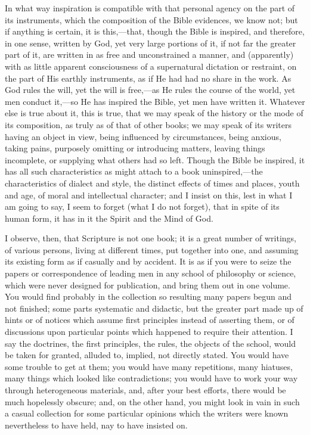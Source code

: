 In what way inspiration is compatible with that personal agency on the part of its instruments, which the composition of the
Bible evidences, we know not; but if anything is certain, it is this,—that,
though the Bible is inspired, and therefore, in one sense, written by
God, yet very large portions of it, if not far the greater part of it,
are written in as free and unconstrained a manner, and (apparently)
with as little apparent consciousness of a supernatural dictation or
restraint, on the part of His earthly instruments, as if He had had no
share in the work. As God rules the will, yet the will is free,—as
He rules the course of the world, yet men conduct it,—so He has
inspired the Bible, yet men have written it. Whatever else is true
about it, this is true, that we may speak of the history or the mode
of its composition, as truly as of that of other books; we may speak
of its writers having an object in view, being influenced by
circumstances, being anxious, taking pains, purposely omitting or
introducing matters, leaving things incomplete, or supplying what
others had so left. Though the Bible be inspired, it has all such
characteristics as might attach to a book uninspired,—the
characteristics of dialect and style, the distinct effects of times
and places, youth and age, of moral and intellectual character; and I
insist on this, lest in what I am going to say, I seem to forget (what
I do not forget), that in spite of its human form, it has in it the
Spirit and the Mind of God.

I observe, then, that Scripture is not one book; it is a great
number of writings, of various persons, living at different times, put
together into one, and assuming its existing form as if casually and
by accident. It is as if you were to seize the papers or
correspondence of leading men in any school of philosophy or science,
which were never designed for publication, and bring them out in one
volume. You would find probably in the collection so resulting
many papers begun and not finished; some parts systematic and
didactic, but the greater part made up of hints or of notices which
assume first principles instead of asserting them, or of discussions
upon particular points which happened to require their attention. I
say the doctrines, the first principles, the rules, the objects of the
school, would be taken for granted, alluded to, implied, not directly
stated. You would have some trouble to get at them; you would have
many repetitions, many hiatuses, many things which looked like
contradictions; you would have to work your way through heterogeneous
materials, and, after your best efforts, there would be much
hopelessly obscure; and, on the other hand, you might look in vain in
such a casual collection for some particular opinions which the
writers were known nevertheless to have held, nay to have insisted on.

